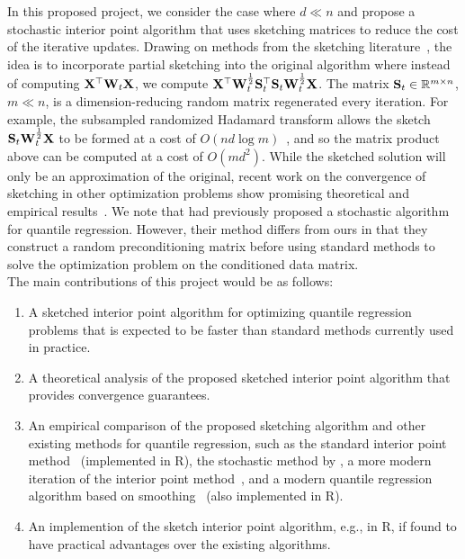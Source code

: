 In this proposed project, we consider the case where $d\ll n$ and propose a stochastic interior point algorithm that uses sketching matrices to reduce the cost of the iterative updates. Drawing on methods from the sketching literature~\cite{Pilanci:2017}, the idea is to incorporate partial sketching into the original algorithm where instead of computing $\mathbf{X}^\top\mathbf{W}_t\mathbf{X}$, we compute $\mathbf{X}^\top\mathbf{W}_t^\frac{1}{2}\mathbf{S}_t^\top\mathbf{S}_t\mathbf{W}_t^\frac{1}{2}\mathbf{X}$.
The matrix $\mathbf{S}_t\in\mathbb{R}^{m\times n}$, $m\ll n$, is a dimension-reducing random matrix regenerated every iteration. For example, the subsampled randomized Hadamard transform allows the sketch $\mathbf{S}_t\mathbf{W}_t^\frac{1}{2}\mathbf{X}$ to be formed at a cost of $O(nd\log m)$~\citep{Lacotte:2020}, and so the matrix product above can be computed at a cost of $O(md^2)$. While the sketched solution will only be an approximation of the original, recent work on the convergence of sketching in other optimization problems show promising theoretical and empirical results~\citep[e.g.,][]{Pilanci:2017,Derezinski:2021,Lacotte:2021}. We note that \citet{Yang:2013} had previously proposed a stochastic algorithm for quantile regression. However, their method differs from ours in that they construct a random preconditioning matrix before using standard methods to solve the optimization problem on the conditioned data matrix.
\\

The main contributions of this project would be as follows:
\begin{enumerate}
\item
A sketched interior point algorithm for optimizing quantile regression problems that is expected to be faster than standard methods currently used in practice.
\item
A theoretical analysis of the proposed sketched interior point algorithm that provides convergence guarantees.
\item
An empirical comparison of the proposed sketching algorithm and other existing methods for quantile regression, such as the standard interior point method~\citep{Portnoy:1997} (implemented in R), the stochastic method by \citet{Yang:2013}, a more modern iteration of the interior point method~\citep{Zhao:2020}, and a modern quantile regression algorithm based on smoothing~\citep{He:2021} (also implemented in R).
\item
An implemention of the sketch interior point algorithm, e.g., in R, if found to have practical advantages over the existing algorithms.
\end{enumerate}

